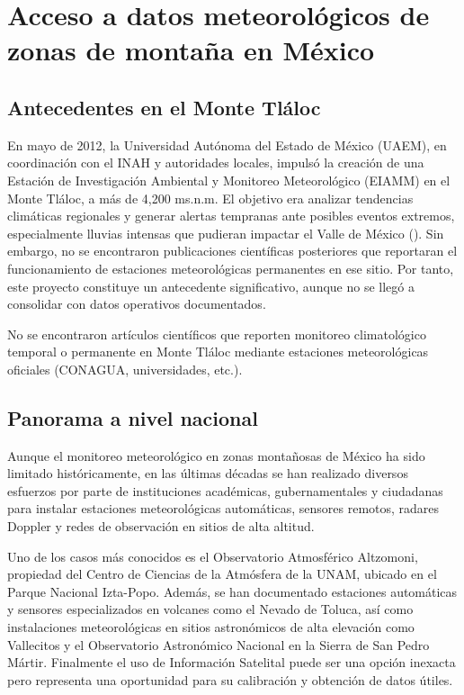 \section{Acceso a datos meteorológicos de zonas de montaña en México}

\subsection{Antecedentes en el Monte Tláloc}

En mayo de 2012, la Universidad Autónoma del Estado de México (UAEM), en coordinación con el INAH y autoridades locales, impulsó la creación de una Estación de Investigación Ambiental y Monitoreo Meteorológico (EIAMM) en el Monte Tláloc, a más de 4,200 ms.n.m. El objetivo era analizar tendencias climáticas regionales y generar alertas tempranas ante posibles eventos extremos, especialmente lluvias intensas que pudieran impactar el Valle de México (\cite{davila2012}). Sin embargo, no se encontraron publicaciones científicas posteriores que reportaran el funcionamiento de estaciones meteorológicas permanentes en ese sitio. Por tanto, este proyecto constituye un antecedente significativo, aunque no se llegó a consolidar con datos operativos documentados.

No se encontraron artículos científicos que reporten monitoreo climatológico temporal o permanente en Monte Tláloc mediante estaciones meteorológicas oficiales (CONAGUA, universidades, etc.).


\subsection{Panorama a nivel nacional}

Aunque el monitoreo meteorológico en zonas montañosas de México ha sido limitado históricamente, en las últimas décadas se han realizado diversos esfuerzos por parte de instituciones académicas, gubernamentales y ciudadanas para instalar estaciones meteorológicas automáticas, sensores remotos, radares Doppler y redes de observación en sitios de alta altitud.

Uno de los casos más conocidos es el Observatorio Atmosférico Altzomoni, propiedad del Centro de Ciencias de la Atmósfera de la UNAM, ubicado en el Parque Nacional Izta-Popo. Además, se han documentado estaciones automáticas y sensores especializados en volcanes como el Nevado de Toluca, así como instalaciones meteorológicas en sitios astronómicos de alta elevación como Vallecitos y el Observatorio Astronómico Nacional en la Sierra de San Pedro Mártir. Finalmente el uso de Información Satelital puede ser una opción inexacta pero representa una oportunidad para su calibración y obtención de datos útiles.





